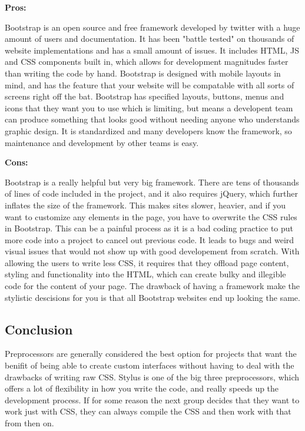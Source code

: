 \documentclass[draftclsnofoot,onecolumn,letterpaper,10pt,compsoc]{IEEEtran}
\begin{document}
    \textbf{Pros:}

    Bootstrap is an open source and free framework developed by twitter with a huge amount of users and documentation.
    It has been "battle tested" on thousands of website implementations and has a small amount of issues.
    It includes HTML, JS and CSS components built in, which allows for development magnitudes faster than writing the code by hand.
    Bootstrap is designed with mobile layouts in mind, and has the feature that your website will be compatable with all sorts of screens right off the bat.
    Bootstrap has specified layouts, buttons, menus and icons that they want you to use which is limiting, but means a developent team can produce something that looks good without needing anyone who understands graphic design.
    It is standardized and many developers know the framework, so maintenance and development by other teams is easy.

    \textbf{Cons:}

    Bootstrap is a really helpful but very big framework.
    There are tens of thousands of lines of code included in the project, and it also requires jQuery, which further inflates the size of the framework.
    This makes sites slower, heavier, and if you want to customize any elements in the page, you have to overwrite the CSS rules in Bootstrap.
    This can be a painful process as it is a bad coding practice to put more code into a project to cancel out previous code.
    It leads to bugs and weird visual issues that would not show up with good developement from scratch.
    With allowing the users to write less CSS, it requires that they offload page content, styling and functionality into the HTML, which can create bulky and illegible code for the content of your page.
    The drawback of having a framework make the stylistic descisions for you is that all Bootstrap websites end up looking the same.

  \subsection{Conclusion}

  Preprocessors are generally considered the best option for projects that want the benifit of being able to create custom interfaces without having to deal with the drawbacks of writing raw CSS.
  Stylus is one of the big three preprocessors, which offers a lot of flexibility in how you write the code, and really speeds up the development process.
  If for some reason the next group decides that they want to work just with CSS, they can always compile the CSS and then work with that from then on.
\end{document}
